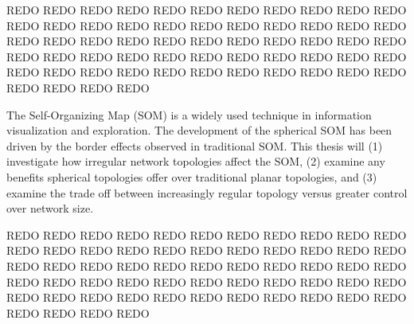 REDO REDO REDO REDO REDO REDO REDO REDO REDO REDO REDO REDO REDO REDO REDO REDO
REDO REDO REDO REDO REDO REDO REDO REDO REDO REDO REDO REDO REDO REDO REDO REDO
REDO REDO REDO REDO REDO REDO REDO REDO REDO REDO REDO REDO REDO REDO REDO REDO
REDO REDO REDO REDO REDO REDO REDO REDO REDO REDO REDO 

The Self-Organizing Map (SOM) is a widely used technique in information
visualization and exploration.  The development of the spherical SOM has been
driven by the border effects observed in traditional SOM.  This thesis will
(1) investigate how irregular network topologies affect the SOM, (2) examine any
benefits spherical topologies offer over traditional planar topologies, and (3)
examine the trade off between increasingly regular topology versus greater
control over network size.  

REDO REDO REDO REDO REDO REDO REDO REDO REDO REDO REDO REDO REDO REDO REDO REDO
REDO REDO REDO REDO REDO REDO REDO REDO REDO REDO REDO REDO REDO REDO REDO REDO
REDO REDO REDO REDO REDO REDO REDO REDO REDO REDO REDO REDO REDO REDO REDO REDO
REDO REDO REDO REDO REDO REDO REDO REDO REDO REDO REDO 
